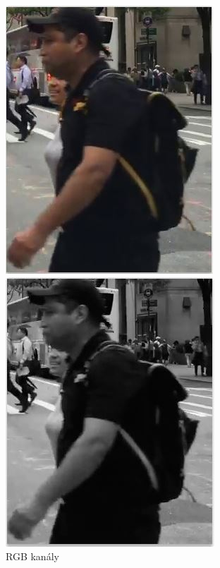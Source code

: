 \begin{figure}[H]
\centering
\begin{minipage}[b]{.3\textwidth}
  \centering
  \includegraphics[width=.8\linewidth]{figures/rgb_luv}
  \caption*{RGB kanály}
\end{minipage}%
\begin{minipage}[b]{.3\textwidth}
  \centering
  \includegraphics[width=.8\linewidth]{figures/luma}

\end{minipage}
\end{figure}
